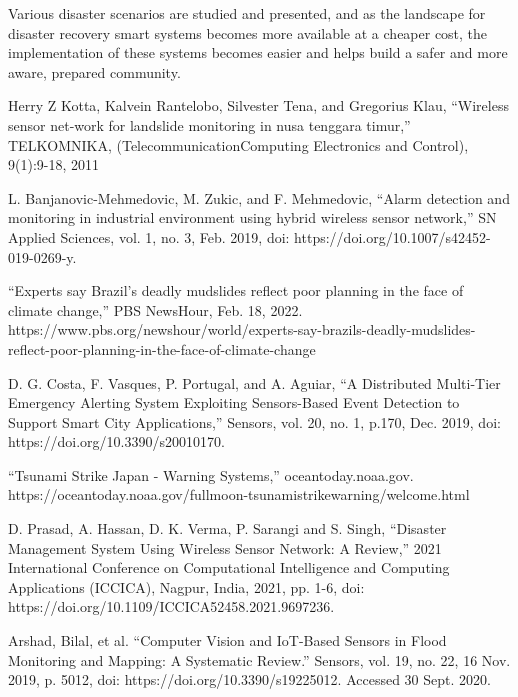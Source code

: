 \documentclass[conference]{IEEEtran}
\begin{document}
Various disaster scenarios are studied and presented, and as the landscape for disaster recovery
smart systems becomes more available at a cheaper cost, the implementation of these systems 
becomes easier and helps build a safer and more aware, prepared community. \par


\begin{thebibliography}{00}
     Herry Z Kotta, Kalvein Rantelobo, Silvester Tena, and Gregorius Klau, ``Wireless sensor
        net-work for landslide monitoring in nusa tenggara timur,'' TELKOMNIKA, 
        (TelecommunicationComputing Electronics and Control), 9(1):9-18, 2011
    
    L. Banjanovic-Mehmedovic, M. Zukic, and F. Mehmedovic, “Alarm detection and monitoring in 
    industrial environment using hybrid wireless sensor network,” SN Applied Sciences, vol. 1, no. 3, 
    Feb. 2019, doi: https://doi.org/10.1007/s42452-019-0269-y.
    
     ``Experts say Brazil's deadly mudslides reflect poor planning in the face of climate change,'' 
        PBS NewsHour, Feb. 18, 2022. https://www.pbs.org/newshour/world/experts-say-brazils-deadly-mudslides-
        reflect-poor-planning-in-the-face-of-climate-change
    
     D. G. Costa, F. Vasques, P. Portugal, and A. Aguiar, “A Distributed Multi-Tier Emergency 
        Alerting System Exploiting Sensors-Based Event Detection to Support Smart City Applications,” Sensors, vol. 20, no. 1, p.170, Dec. 2019, doi: https://doi.org/10.3390/s20010170.
    
     “Tsunami Strike Japan - Warning Systems,” oceantoday.noaa.gov.
        https://oceantoday.noaa.gov/fullmoon-tsunamistrikewarning/welcome.html

     D. Prasad, A. Hassan, D. K. Verma, P. Sarangi and S. Singh, ``Disaster Management System
        Using Wireless Sensor Network: A Review,'' 2021 International Conference on Computational 
        Intelligence and Computing Applications (ICCICA), Nagpur, India, 2021, pp. 1-6, 
        doi: https://doi.org/10.1109/ICCICA52458.2021.9697236.
    
     Arshad, Bilal, et al. ``Computer Vision and IoT-Based Sensors in Flood Monitoring and
        Mapping: A Systematic Review.'' Sensors, vol. 19, no. 22, 16 Nov. 2019, p. 5012, 
        doi: https://doi.org/10.3390/s19225012. Accessed 30 Sept. 2020.


\end{thebibliography}
\end{document}

